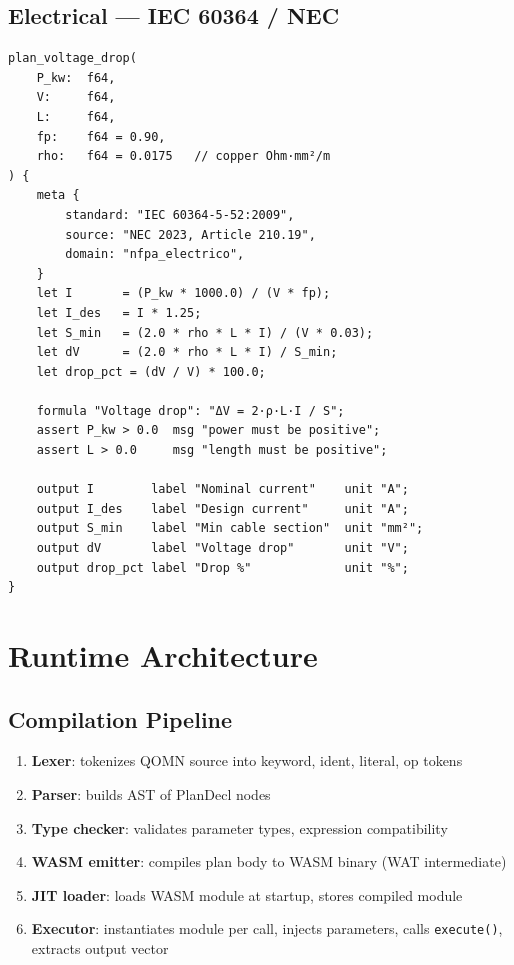 \documentclass[12pt,a4paper]{article}
\begin{document}
\subsection{Electrical — IEC 60364 / NEC}

\begin{lstlisting}[caption=plan\_voltage\_drop — IEC 60364-5-52]
plan_voltage_drop(
    P_kw:  f64,
    V:     f64,
    L:     f64,
    fp:    f64 = 0.90,
    rho:   f64 = 0.0175   // copper Ohm·mm²/m
) {
    meta {
        standard: "IEC 60364-5-52:2009",
        source: "NEC 2023, Article 210.19",
        domain: "nfpa_electrico",
    }
    let I       = (P_kw * 1000.0) / (V * fp);
    let I_des   = I * 1.25;
    let S_min   = (2.0 * rho * L * I) / (V * 0.03);
    let dV      = (2.0 * rho * L * I) / S_min;
    let drop_pct = (dV / V) * 100.0;

    formula "Voltage drop": "ΔV = 2·ρ·L·I / S";
    assert P_kw > 0.0  msg "power must be positive";
    assert L > 0.0     msg "length must be positive";

    output I        label "Nominal current"    unit "A";
    output I_des    label "Design current"     unit "A";
    output S_min    label "Min cable section"  unit "mm²";
    output dV       label "Voltage drop"       unit "V";
    output drop_pct label "Drop %"             unit "%";
}
\end{lstlisting}

\section{Runtime Architecture}

\subsection{Compilation Pipeline}

\begin{enumerate}
  \item \textbf{Lexer}: tokenizes QOMN source into keyword, ident, literal, op tokens
  \item \textbf{Parser}: builds AST of PlanDecl nodes
  \item \textbf{Type checker}: validates parameter types, expression compatibility
  \item \textbf{WASM emitter}: compiles plan body to WASM binary (WAT intermediate)
  \item \textbf{JIT loader}: loads WASM module at startup, stores compiled module
  \item \textbf{Executor}: instantiates module per call, injects parameters,
    calls \texttt{execute()}, extracts output vector
\end{enumerate}
\end{document}
